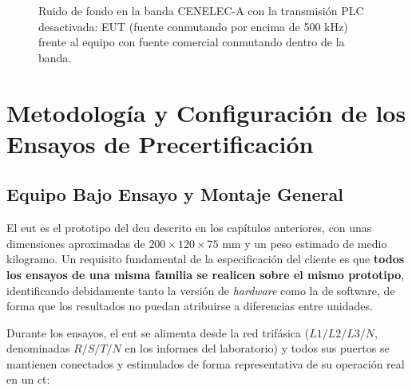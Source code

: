 \begin{figure}[htbp]
    \centering
    \caption{Ruido de fondo en la banda CENELEC-A con la transmisión PLC desactivada: EUT (fuente conmutando por encima de 500 kHz) frente al equipo con fuente comercial conmutando dentro de la banda.}
    \label{fig:ruido_banda_eut_vs_comercial}
\end{figure}


\section{Metodología y Configuración de los Ensayos de Precertificación}
\label{sec:metodologia_ensayos}

\subsection{Equipo Bajo Ensayo y Montaje General}
\label{subsec:eut_montaje}

El \gls{eut} es el prototipo del \gls{dcu} descrito en los capítulos anteriores, con unas dimensiones aproximadas de $200 \times 120 \times 75$ mm y un peso estimado de medio kilogramo. Un requisito fundamental de la especificación del cliente es que \textbf{todos los ensayos de una misma familia se realicen sobre el mismo prototipo}, identificando debidamente tanto la versión de \textit{hardware} como la de software, de forma que los resultados no puedan atribuirse a diferencias entre unidades.

Durante los ensayos, el \gls{eut} se alimenta desde la red trifásica ($L1/L2/L3/N$, denominadas $R/S/T/N$ en los informes del laboratorio) y todos sus puertos se mantienen conectados y estimulados de forma representativa de su operación real en un \gls{ct}:

